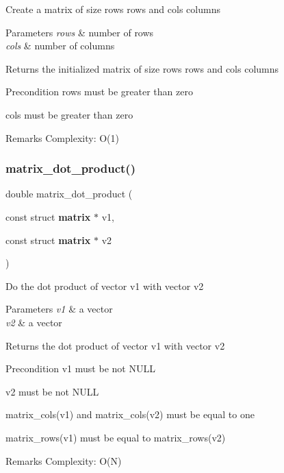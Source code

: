 Create a matrix of size {\ttfamily rows} rows and {\ttfamily cols} columns


\begin{DoxyParams}{Parameters}
{\em rows} & number of rows \\
\hline
{\em cols} & number of columns\\
\hline
\end{DoxyParams}
\begin{DoxyReturn}{Returns}
the initialized matrix of size {\ttfamily rows} rows and {\ttfamily cols} columns
\end{DoxyReturn}
\begin{DoxyPrecond}{Precondition}
{\ttfamily rows} must be greater than zero 

{\ttfamily cols} must be greater than zero
\end{DoxyPrecond}
\begin{DoxyRemark}{Remarks}
Complexity\+: O(1) 
\end{DoxyRemark}
\mbox{\label{matrix_8c_a7ba7365201acc5889936e1836d14cc8b}} 
\subsubsection{matrix\+\_\+dot\+\_\+product()}
{\footnotesize\ttfamily double matrix\+\_\+dot\+\_\+product (\begin{DoxyParamCaption}\item[{const struct \textbf{ matrix} $\ast$}]{v1,  }\item[{const struct \textbf{ matrix} $\ast$}]{v2 }\end{DoxyParamCaption})}

Do the dot product of vector {\ttfamily v1} with vector {\ttfamily v2}


\begin{DoxyParams}{Parameters}
{\em v1} & a vector \\
\hline
{\em v2} & a vector \\
\hline
\end{DoxyParams}
\begin{DoxyReturn}{Returns}
the dot product of vector {\ttfamily v1} with vector {\ttfamily v2}
\end{DoxyReturn}
\begin{DoxyPrecond}{Precondition}
{\ttfamily v1} must be not N\+U\+LL 

{\ttfamily v2} must be not N\+U\+LL 

{\ttfamily matrix\+\_\+cols(v1)} and {\ttfamily matrix\+\_\+cols(v2)} must be equal to one 

{\ttfamily matrix\+\_\+rows(v1)} must be equal to {\ttfamily matrix\+\_\+rows(v2)}
\end{DoxyPrecond}
\begin{DoxyRemark}{Remarks}
Complexity\+: O(\+N) 
\end{DoxyRemark}
\mbox{\label{matrix_8c_ac19cd61ef9f183a9b92d6789399f8646}} 
